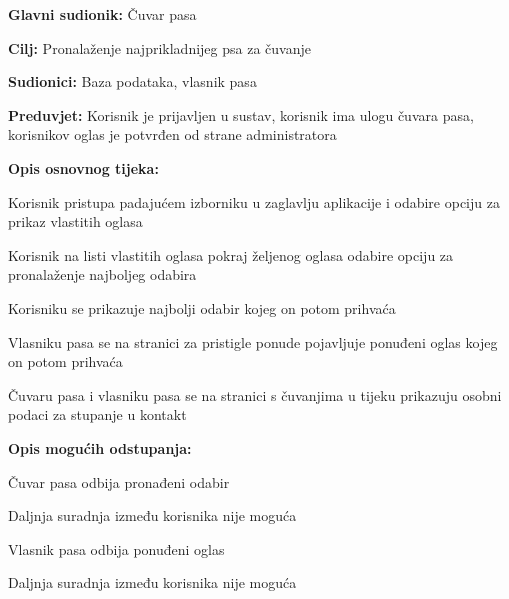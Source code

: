 					\noindent {}
					\begin{packed_item}
						
						\item \textbf{Glavni sudionik: } Čuvar pasa
						\item  \textbf{Cilj:} Pronalaženje najprikladnijeg psa za čuvanje
						\item  \textbf{Sudionici:} Baza podataka, vlasnik pasa
						\item  \textbf{Preduvjet:} Korisnik je prijavljen u sustav, korisnik ima ulogu čuvara pasa, korisnikov oglas je potvrđen od strane administratora
						\item  \textbf{Opis osnovnog tijeka:}
						
						\item[] \begin{packed_enum}
							
							\item Korisnik pristupa padajućem izborniku u zaglavlju aplikacije i odabire opciju za prikaz vlastitih oglasa   
							\item Korisnik na listi vlastitih oglasa pokraj željenog oglasa odabire opciju za pronalaženje najboljeg odabira 
							\item Korisniku se prikazuje najbolji odabir kojeg on potom prihvaća
							\item Vlasniku pasa se na stranici za pristigle ponude pojavljuje ponuđeni oglas kojeg on potom prihvaća
							\item Čuvaru pasa i vlasniku pasa se na stranici s čuvanjima u tijeku prikazuju osobni podaci za stupanje u kontakt
							
						\end{packed_enum}
						
						\item  \textbf{Opis mogućih odstupanja:}
						
						\item[] \begin{packed_item}
							
							\item[3.a] Čuvar pasa odbija pronađeni odabir
							\item[] \begin{packed_enum}
								
								\item Daljnja suradnja između korisnika nije moguća
								
							\end{packed_enum}
							\item[4.a] Vlasnik pasa odbija ponuđeni oglas
							
							\item[] \begin{packed_enum}
								
								\item Daljnja suradnja između korisnika nije moguća
								
							\end{packed_enum}
						\end{packed_item}
					\end{packed_item}		

